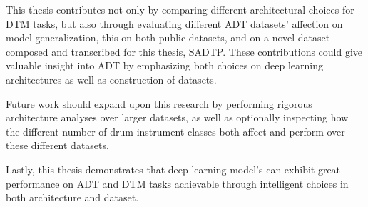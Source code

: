 This thesis contributes not only by comparing different architectural choices for \gls{DTM} tasks, but also through evaluating different \gls{ADT} datasets' affection on model generalization, this on both public datasets, and on a novel dataset composed and transcribed for this thesis, SADTP. These contributions could give valuable insight into \gls{ADT} by emphasizing both choices on deep learning architectures as well as construction of datasets.

Future work should expand upon this research by performing rigorous architecture analyses over larger datasets, as well as optionally inspecting how the different number of drum instrument classes both affect and perform over these different datasets.

Lastly, this thesis demonstrates that deep learning model's can exhibit great performance on \gls{ADT} and \gls{DTM} tasks achievable through intelligent choices in both architecture and dataset.